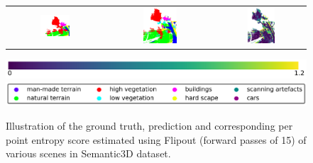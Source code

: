 \begin{figure}[h!]
\begin{tabular}{ccc}
            \includegraphics[width=0.33\textwidth, height=0.18\textheight]{images/seg_output/sem3d_seg_output/3_GT.pdf} &
            \includegraphics[width=0.33\textwidth, height=0.18\textheight]{images/seg_output/flipout/sem3d_3.pdf}& 
            \includegraphics[width=0.33\textwidth, height=0.18\textheight]{images/seg_output/sem3d_seg_output/ent_fout_3.pdf}\\
        \end{tabular}
        \includegraphics[scale=0.45]{images/ent_legend.pdf}
        \includegraphics[scale=0.45]{images/legend.png}
        \caption{Illustration of the ground truth, prediction and corresponding per point entropy score estimated using Flipout (forward passes of 15) of various scenes in Semantic3D dataset.}
        \label{fig:fout_sem3d_entmap}
    \end{figure}

